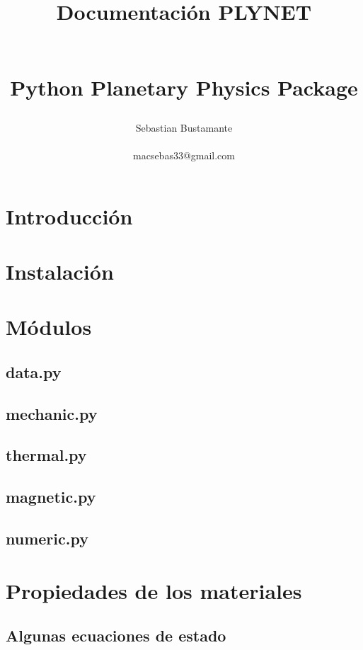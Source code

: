 \documentclass[10pt]{book}
\begin{document}
\title{\begin{Huge}
\textbf{Documentación PLYNET}
\end{Huge} \\ Python Planetary Physics Package}
\author{ Sebastian Bustamante \\ \begin{small}
macsebas33@gmail.com
\end{small} }
\maketitle

\newpage{\pagestyle{empty}\cleardoublepage}  

\tableofcontents
\newpage{\pagestyle{empty}\cleardoublepage}  

\chapter{Introducción}

\chapter{Instalación}

\chapter{Módulos}
	\section{data.py}
	\section{mechanic.py}
	\section{thermal.py}
	\section{magnetic.py}
	\section{numeric.py}

\chapter{Propiedades de los materiales}
	\section{Algunas ecuaciones de estado}
\end{document}
